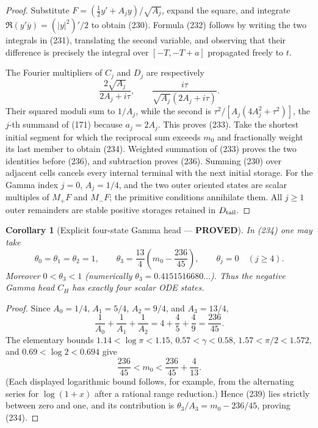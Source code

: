 \documentclass[11pt]{article}
\newtheorem{corollary}[theorem]{Corollary}
\newcommand{\PROVED}{\textcolor{green!45!black}{\textbf{PROVED}}}
\begin{document}
\begin{proof}
Substitute
$F=(\frac12y'+A_jy)/\sqrt{A_j}$, expand the square, and integrate
$\Re(y'\overline y)=(|y|^2)'/2$ to obtain (230).  Formula (232) follows by
writing the two integrals in (231), translating the second variable, and
observing that their difference is precisely the integral over
$[-T,-T+a]$ propagated freely to $t$.

The Fourier multipliers of $C_j$ and $D_j$ are respectively
\[
 \frac{2\sqrt{A_j}}{2A_j+i\tau},
 \qquad
 \frac{i\tau}{\sqrt{A_j}(2A_j+i\tau)}.
\]
Their squared moduli sum to $1/A_j$, while the second is
$\tau^2/[A_j(4A_j^2+\tau^2)]$, the $j$-th summand of (171) because
$a_j=2A_j$.  This proves (233).  Take the shortest initial segment for which
the reciprocal sum exceeds $m_0$ and fractionally weight its last member to
obtain (234).  Weighted summation of (233) proves the two identities before
(236), and subtraction proves (236).  Summing (230) over adjacent cells
cancels every internal terminal with the next initial storage.  For the
Gamma index $j=0$, $A_{j}=1/4$, and the two outer oriented states
are scalar multiples of $M_+F$ and
$M_-F$; the primitive conditions annihilate them.  All $j\ge1$ outer
remainders are stable positive storages retained in $D_{\rm tail}$.
\end{proof}

\begin{corollary}[Explicit four-state Gamma head --- \PROVED]
In (234) one may take
\begin{equation}
 \theta_0=\theta_1=\theta_2=1,
 \qquad
 \theta_3=\frac{13}{4}
 \left(m_0-\frac{236}{45}\right),
 \qquad
 \theta_j=0\quad(j\ge4).                              \tag{239}
\end{equation}
Moreover $0<\theta_3<1$ (numerically
$\theta_3=0.4151516680\ldots$).  Thus the negative Gamma head $C_H$ has
exactly four scalar ODE states.
\end{corollary}

\begin{proof}
Since $A_0=1/4$, $A_1=5/4$, $A_2=9/4$, and $A_3=13/4$,
\[
 \frac1{A_0}+\frac1{A_1}+\frac1{A_2}
 =4+\frac45+\frac49=\frac{236}{45}.
\]
The elementary bounds
$1.14<\log\pi<1.15$, $0.57<\gamma<0.58$,
$1.57<\pi/2<1.572$, and $0.69<\log2<0.694$ give
\[
 \frac{236}{45}<m_0<\frac{236}{45}+\frac4{13}.
\]
(Each displayed logarithmic bound follows, for example, from the alternating
series for $\log(1+x)$ after a rational range reduction.)  Hence (239) lies
strictly between zero and one, and its contribution is
$\theta_3/A_3=m_0-236/45$, proving (234).
\end{proof}
\end{document}

